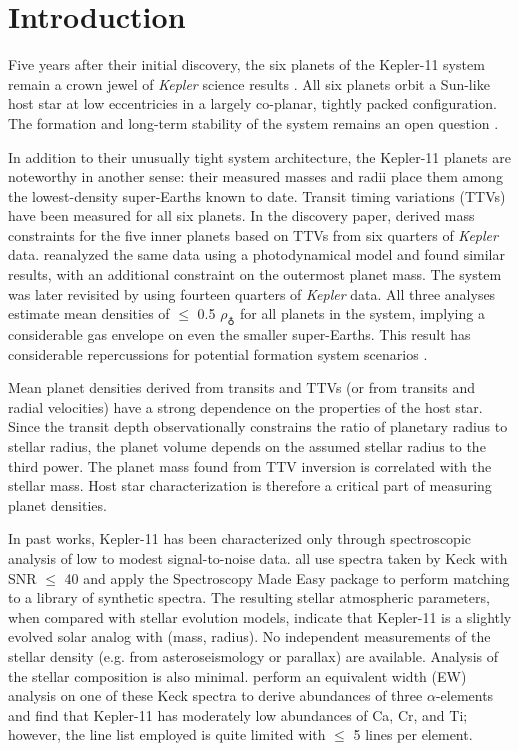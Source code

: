 \documentclass[oneside]{emulateapj}
\begin{document}
\section{Introduction}

Five years after their initial discovery, the six planets of the Kepler-11 system remain a crown jewel of \textit{Kepler} science results \citep{Lissauer2011}. All six planets orbit a Sun-like host star at low eccentricies in a largely co-planar, tightly packed configuration. The formation and long-term stability of the system remains an open question \citep[see e.g.][]{Ikoma2012, Hands2014, Mahajan2014}. 

In addition to their unusually tight system architecture, the Kepler-11 planets are noteworthy in another sense: their measured masses and radii place them among the lowest-density super-Earths known to date. Transit timing variations (TTVs) have been measured for all six planets. In the discovery paper, \citet{Lissauer2011} derived mass constraints for the five inner planets based on TTVs from six quarters of \textit{Kepler} data. \citet{Migaszewski2012} reanalyzed the same data using a photodynamical model and found similar results, with an additional constraint on the outermost planet mass. The system was later revisited by \citet{Lissauer2013} using fourteen quarters of \textit{Kepler} data. All three analyses estimate mean densities of $\leq$ 0.5 $\rho_{\earth}$ for all planets in the system, implying a considerable gas envelope on even the smaller super-Earths. This result has considerable repercussions for potential formation system scenarios .

Mean planet densities derived from transits and TTVs (or from transits and radial velocities) have a strong dependence on the properties of the host star. Since the transit depth observationally constrains the ratio of planetary radius to stellar radius, the planet volume depends on the assumed stellar radius to the third power. The planet mass found from TTV inversion is correlated with the stellar mass. Host star characterization is therefore a critical part of measuring planet densities.

In past works, Kepler-11 has been characterized only through spectroscopic analysis of low to modest signal-to-noise data. \citet{Lissauer2011, Lissauer2013, Rowe2014} all use spectra taken by Keck with SNR $\leq$ 40 and apply the Spectroscopy Made Easy package \citep[SME,][]{Valenti1996} to perform matching to a library of synthetic spectra. The resulting stellar atmospheric parameters, when compared with stellar evolution models, indicate that Kepler-11 is a slightly evolved solar analog with (mass, radius). No independent measurements of the stellar density (e.g. from asteroseismology or parallax) are available. Analysis of the stellar composition is also minimal. \citet{Adibekyan2012b} perform an equivalent width (EW) analysis on one of these Keck spectra to derive abundances of three $\alpha$-elements and find that Kepler-11 has moderately low abundances of Ca, Cr, and Ti; however, the line list employed is quite limited with $\leq$ 5 lines per element.
\end{document}
